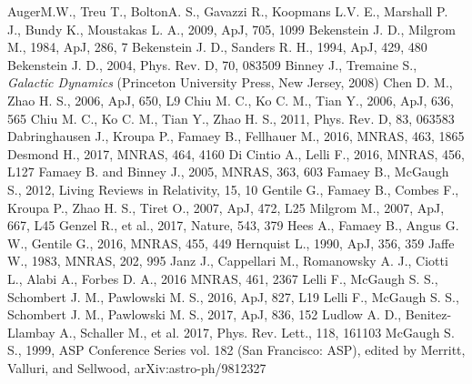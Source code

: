 \documentclass[fleqn,usenatbib,useAMS]{mnras}
\begin{document}
\begin{thebibliography}{}
AugerM.W., Treu T., BoltonA. S., Gavazzi R., Koopmans L.V. E., Marshall P. J., Bundy K., Moustakas L. A., 2009, ApJ, 705, 1099
Bekenstein J. D., Milgrom M., 1984, ApJ, 286, 7
Bekenstein J. D., Sanders R. H., 1994, ApJ, 429, 480
Bekenstein J. D., 2004, Phys. Rev. D, 70, 083509
Binney J., Tremaine S., \textit{Galactic Dynamics} (Princeton University Press, New Jersey, 2008)
Chen D. M., Zhao H. S., 2006, ApJ, 650, L9
Chiu M. C., Ko C. M., Tian Y., 2006, ApJ, 636, 565
Chiu M. C., Ko C. M., Tian Y., Zhao H. S., 2011, Phys. Rev. D, 83, 063583
Dabringhausen J., Kroupa P., Famaey B., Fellhauer M., 2016, MNRAS, 463, 1865
Desmond H., 2017, MNRAS, 464, 4160
Di Cintio A., Lelli F., 2016, MNRAS, 456, L127
Famaey B. and Binney J., 2005, MNRAS, 363, 603
Famaey B., McGaugh S., 2012, Living Reviews in Relativity, 15, 10
Gentile G., Famaey B., Combes F., Kroupa P., Zhao H. S., Tiret O., 2007, ApJ, 472, L25
Milgrom M., 2007, ApJ, 667, L45
Genzel R., et al., 2017, Nature, 543, 379
Hees A., Famaey B., Angus G. W., Gentile G., 2016, MNRAS, 455, 449
Hernquist L., 1990, ApJ, 356, 359
Jaffe W., 1983, MNRAS, 202, 995
Janz J., Cappellari M., Romanowsky A. J., Ciotti L., Alabi A., Forbes D. A., 2016 MNRAS, 461, 2367
Lelli F., McGaugh S. S., Schombert J. M., Pawlowski M. S., 2016, ApJ, 827, L19
Lelli F., McGaugh S. S., Schombert J. M., Pawlowski M. S., 2017, ApJ, 836, 152
Ludlow A. D., Benitez-Llambay A., Schaller M., et al. 2017, Phys. Rev. Lett., 118, 161103
McGaugh S. S., 1999, ASP Conference Series vol. 182 (San Francisco: ASP), edited by Merritt, Valluri, and Sellwood, arXiv:astro-ph/9812327

\end{thebibliography}
\end{document}
